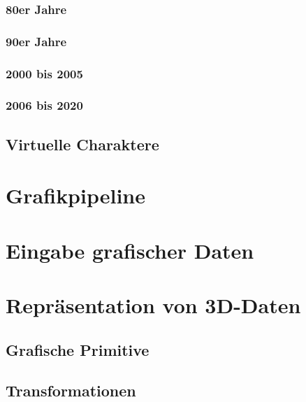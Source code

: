 \documentclass[a4paper, 11pt, accentcolor = tud3b]{tudreport}
\begin{document}
				\subsubsection{80er Jahre} %

				\subsubsection{90er Jahre} %

				\subsubsection{2000 bis 2005} %

				\subsubsection{2006 bis 2020} %

			\subsection{Virtuelle Charaktere} %

		\section{Grafikpipeline} %

		\section{Eingabe grafischer Daten} %

		\section{Repräsentation von 3D-Daten} %

			\subsection{Grafische Primitive} %

			\subsection{Transformationen} %
\end{document}
